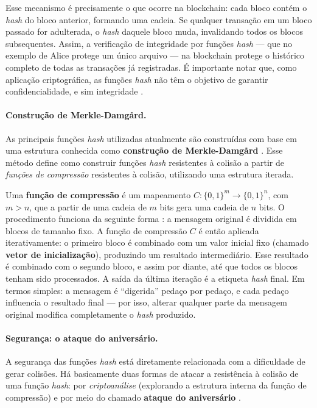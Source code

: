 Esse mecanismo é precisamente o que ocorre na blockchain: cada bloco contém o \textit{hash} do bloco anterior, formando uma cadeia. Se qualquer transação em um bloco passado for adulterada, o \textit{hash} daquele bloco muda, invalidando todos os blocos subsequentes. Assim, a verificação de integridade por funções \textit{hash} --- que no exemplo de Alice protege um único arquivo --- na blockchain protege o histórico completo de todas as transações já registradas. É importante notar que, como aplicação criptográfica, as funções \textit{hash} não têm o objetivo de garantir confidencialidade, e sim integridade \cite{tomaz2014}.

\paragraph{Construção de Merkle-Damgård.}

As principais funções \textit{hash} utilizadas atualmente são construídas com base em uma estrutura conhecida como \textbf{construção de Merkle-Damgård} \cite{stallings2008}. Esse método define como construir funções \textit{hash} resistentes à colisão a partir de \textit{funções de compressão} resistentes à colisão, utilizando uma estrutura iterada.

Uma \textbf{função de compressão} é um mapeamento $C: \{0,1\}^m \to \{0,1\}^n$, com $m > n$, que a partir de uma cadeia de $m$ bits gera uma cadeia de $n$ bits. O procedimento funciona da seguinte forma \cite{tomaz2014}: a mensagem original é dividida em blocos de tamanho fixo. A função de compressão $C$ é então aplicada iterativamente: o primeiro bloco é combinado com um valor inicial fixo (chamado \textbf{vetor de inicialização}), produzindo um resultado intermediário. Esse resultado é combinado com o segundo bloco, e assim por diante, até que todos os blocos tenham sido processados. A saída da última iteração é a etiqueta \textit{hash} final. Em termos simples: a mensagem é ``digerida'' pedaço por pedaço, e cada pedaço influencia o resultado final --- por isso, alterar qualquer parte da mensagem original modifica completamente o \textit{hash} produzido.

\paragraph{Segurança: o ataque do aniversário.}

A segurança das funções \textit{hash} está diretamente relacionada com a dificuldade de gerar colisões. Há basicamente duas formas de atacar a resistência à colisão de uma função \textit{hash}: por \textit{criptoanálise} (explorando a estrutura interna da função de compressão) e por meio do chamado \textbf{ataque do aniversário} \cite{tomaz2014}.

